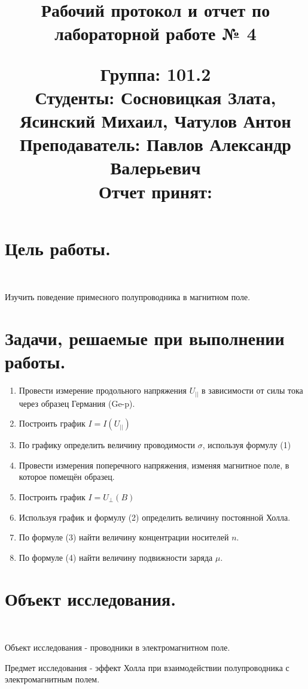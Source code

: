 \documentclass[12pt,letterpaper]{article}
\title{ \textbf{Рабочий протокол и отчет по
лабораторной работе № 4}\\ \vspace{1mm}
\begin{flushleft}
{\large
Группа: 101.2\\
Студенты: Сосновицкая Злата, Ясинский Михаил, Чатулов Антон\\
Преподаватель: Павлов Александр Валерьевич\\
Отчет принят:}\\
\end{flushleft}
\author{}
\date{}
}
\begin{document}
 \maketitle
      \section{Цель работы.}\
      \par Изучить поведение примесного полупроводника в магнитном
поле.
      \par

      \section{Задачи, решаемые при выполнении работы.}\par
      \begin{enumerate}
          \item Провести измерение продольного напряжения $U_{||}$ в зависимости от силы тока через образец Германия (Ge-p).
          \item Построить график $I=I(U_{||})$
          \item По графику определить величину проводимости $\sigma$, используя формулу (1)
          \item Провести измерения поперечного напряжения, изменяя магнитное поле, в которое помещён образец.
          \item Построить график $I=U_{\bot}(B)$
          \item Используя график и формулу (2) определить величину постоянной Холла.
          \item По формуле (3) найти величину концентрации носителей $n$.
          \item По формуле (4) найти величину подвижности заряда $\mu$.

      \end{enumerate}

      \section{Объект исследования.}\


      \par Объект исследования - проводники в электромагнитном поле.\
      \par Предмет исследования - эффект Холла при взаимодействии полупроводника с электромагнитным полем.\par
\end{document}
